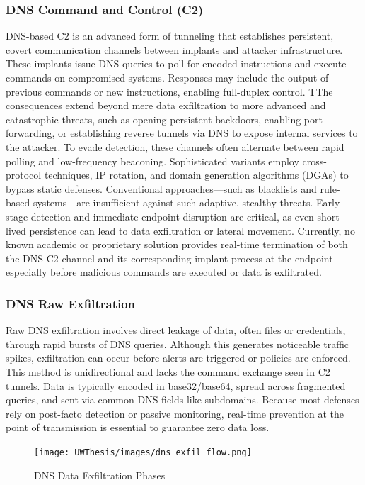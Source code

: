 \documentclass [11pt, proquest] {uwthesis}[2020/02/24]
\begin{document}
\subsubsection{DNS Command and Control (C2)}
DNS-based C2 is an advanced form of tunneling that establishes persistent, covert communication channels between implants and attacker infrastructure. These implants issue DNS queries to poll for encoded instructions and execute commands on compromised systems. Responses may include the output of previous commands or new instructions, enabling full-duplex control. TThe consequences extend beyond mere data exfiltration to more advanced and catastrophic threats, such as opening persistent backdoors, enabling port forwarding, or establishing reverse tunnels via DNS to expose internal services to the attacker. To evade detection, these channels often alternate between rapid polling and low-frequency beaconing. Sophisticated variants employ cross-protocol techniques, IP rotation, and domain generation algorithms (DGAs) to bypass static defenses. Conventional approaches—such as blacklists and rule-based systems—are insufficient against such adaptive, stealthy threats. Early-stage detection and immediate endpoint disruption are critical, as even short-lived persistence can lead to data exfiltration or lateral movement. Currently, no known academic or proprietary solution provides real-time termination of both the DNS C2 channel and its corresponding implant process at the endpoint—especially before malicious commands are executed or data is exfiltrated.


\subsubsection{DNS Raw Exfiltration}
Raw DNS exfiltration involves direct leakage of data, often files or credentials, through rapid bursts of DNS queries. Although this generates noticeable traffic spikes, exfiltration can occur before alerts are triggered or policies are enforced.
This method is unidirectional and lacks the command exchange seen in C2 tunnels. Data is typically encoded in base32/base64, spread across fragmented queries, and sent via common DNS fields like subdomains. Because most defenses rely on post-facto detection or passive monitoring, real-time prevention at the point of transmission is essential to guarantee zero data loss.

\label{sec:dns c2 flow}
\begin{figure}[h]
\texttt{[image: UWThesis/images/dns\_exfil\_flow.png]}
\caption{DNS Data Exfiltration Phases}
\end{figure}
\end{document}
